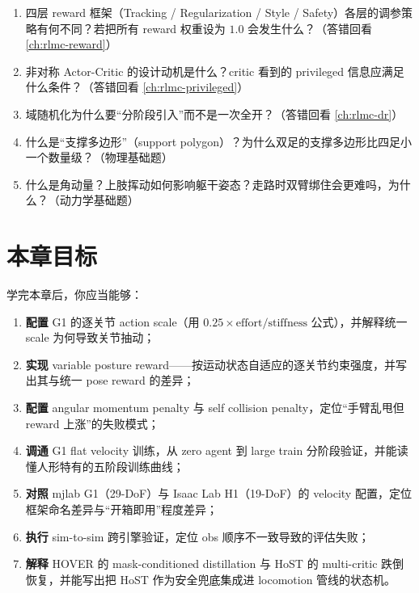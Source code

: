 \begin{practice}
\begin{enumerate}
  \item 四层 reward 框架（Tracking / Regularization / Style / Safety）各层的调参策略有何不同？若把所有 reward 权重设为 $1.0$ 会发生什么？（答错回看 \cref{ch:rlmc-reward}）
  \item 非对称 Actor-Critic 的设计动机是什么？critic 看到的 privileged 信息应满足什么条件？（答错回看 \cref{ch:rlmc-privileged}）
  \item 域随机化为什么要“分阶段引入”而不是一次全开？（答错回看 \cref{ch:rlmc-dr}）
  \item 什么是“支撑多边形”（support polygon）？为什么双足的支撑多边形比四足小一个数量级？（物理基础题）
  \item 什么是角动量？上肢挥动如何影响躯干姿态？走路时双臂绑住会更难吗，为什么？（动力学基础题）
\end{enumerate}
\end{practice}

\section*{本章目标}

学完本章后，你应当能够：
\begin{enumerate}
  \item \textbf{配置} G1 的逐关节 action scale（用 $0.25\times\text{effort}/\text{stiffness}$ 公式），并解释统一 scale 为何导致关节抽动；
  \item \textbf{实现} variable posture reward——按运动状态自适应的逐关节约束强度，并写出其与统一 pose reward 的差异；
  \item \textbf{配置} angular momentum penalty 与 self collision penalty，定位“手臂乱甩但 reward 上涨”的失败模式；
  \item \textbf{调通} G1 flat velocity 训练，从 zero agent 到 large train 分阶段验证，并能读懂人形特有的五阶段训练曲线；
  \item \textbf{对照} mjlab G1（29-DoF）与 Isaac Lab H1（19-DoF）的 velocity 配置，定位框架命名差异与“开箱即用”程度差异；
  \item \textbf{执行} sim-to-sim 跨引擎验证，定位 obs 顺序不一致导致的评估失败；
  \item \textbf{解释} HOVER 的 mask-conditioned distillation 与 HoST 的 multi-critic 跌倒恢复，并能写出把 HoST 作为安全兜底集成进 locomotion 管线的状态机。
\end{enumerate}

